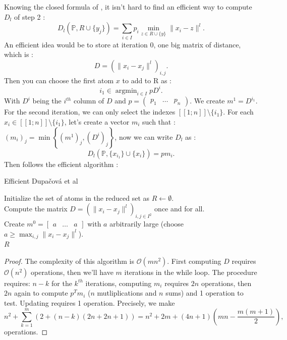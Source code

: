 \documentclass{amsart}
\newcommand{\argmin}{\mathop{\arg\min}}
\begin{document}
Knowing the closed formula of , it isn't hard to find an efficient way to compute $D_l$ of step 2 : 
$$
D_l\left(\mathbb{P},R\cup \{y_j\}\right)=\sum_{i\in I}p_i\min_{z\in R\cup\{y\}}\lVert x_i-z \rVert^l.
$$
An efficient idea would be to store at iteration $0$, one big matrix of distance, which is : 
$$
D = \left(\lVert x_i-x_j\rVert ^l \right)_{i,j}.
$$
Then you can choose the first atom $x$ to add to R as :
$$
i_1 \in \argmin_{i\in I} pD^i.
$$
With $D^i$ being the $i^{th}$ column of $D$ and $p=\begin{pmatrix}
    p_1 & \hdots & p_n
\end{pmatrix}$.
We create $m^1=D^{i_1}$. For the second iteration, we can only select the indexes $[\![1;n]\!]\setminus \{i_1\}$. For each $x_i\in [\![1;n]\!]\setminus \{i_1\}$, let's create a vector $m_i$ such that : $\left(m_i\right)_j=\min\left\{\left(m^1\right)_j,\left(D^i\right)_j\right\}$, now we can write $D_l$ as : $$
D_l\left(\mathbb{P},\{x_{i_1}\}\cup \{x_i\}\right)=pm_i.
$$
Then follows the efficient algorithm :
\begin{algorithm}
\caption{Efficient Dupačová et al}
Initialize the set of atoms in the reduced set as $R \gets \emptyset$.\\
Compute the matrix $D = \left(\| x_i - x_j \|^l \right)_{i,j \in I^2}$ once and for all.\\
Create $m^0 = \begin{bmatrix} a & \hdots & a \end{bmatrix}$ with $a$ arbitrarily large (choose $a \geq \max_{i,j} \| x_i - x_j \|^l$).\\
\Return $R$\\
\end{algorithm}
\begin{proof}\label{complexity}
The complexity of this algorithm is $\mathcal{O}\left(mn^2\right)$. First computing $D$ requires $\mathcal{O}\left(n^2\right)$ operations, then we'll have $m$ iterations in the while loop. The procedure requires: $n-k$ for the $k^{th}$ iterations, computing $m_i$ requires $2n$ operations, then $2n$ again to compute $p^Tm_i$ ($n$ mutliplications and $n$ sums) and 1 operation to test. Updating requires 1 operation.
Precisely, we make
$$
n^2+\sum_{k=1}^m\left(2+\left(n-k\right)\left(2n+2n+1\right)\right)= n^2+2m+\left(4n+1\right)\left(mn-\frac{m\left(m+1\right)}{2}\right),
$$
operations.
\end{proof}
\end{document}

